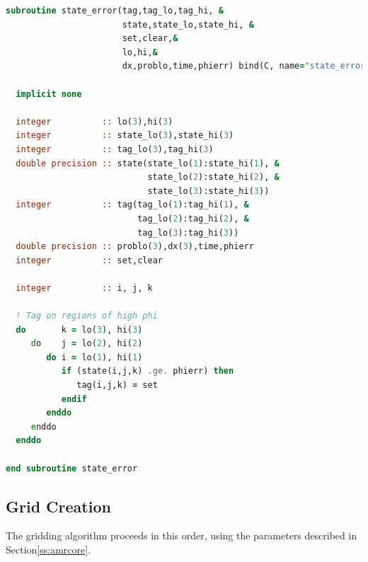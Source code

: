 \begin{lstlisting}[language=fortran]
subroutine state_error(tag,tag_lo,tag_hi, &
                       state,state_lo,state_hi, &
                       set,clear,&
                       lo,hi,&
                       dx,problo,time,phierr) bind(C, name="state_error")

  implicit none
  
  integer          :: lo(3),hi(3)
  integer          :: state_lo(3),state_hi(3)
  integer          :: tag_lo(3),tag_hi(3)
  double precision :: state(state_lo(1):state_hi(1), &
                            state_lo(2):state_hi(2), &
                            state_lo(3):state_hi(3))
  integer          :: tag(tag_lo(1):tag_hi(1), &
                          tag_lo(2):tag_hi(2), &
                          tag_lo(3):tag_hi(3))
  double precision :: problo(3),dx(3),time,phierr
  integer          :: set,clear

  integer          :: i, j, k

  ! Tag on regions of high phi
  do       k = lo(3), hi(3)
     do    j = lo(2), hi(2)
        do i = lo(1), hi(1)
           if (state(i,j,k) .ge. phierr) then
              tag(i,j,k) = set
           endif
        enddo
     enddo
  enddo

end subroutine state_error
\end{lstlisting}

\subsection{Grid Creation \label{ss:grid_creation}}

\noindent The gridding algorithm proceeds in this order, using the parameters described 
in Section\ref{ss:amrcore}.

